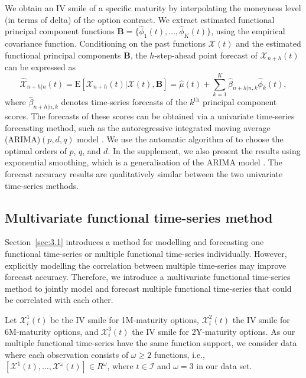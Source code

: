 \documentclass[12pt,a4paper]{article}
\newcommand{\X}{\mathcal{X}}
\begin{document}
We obtain an IV smile of a specific maturity by interpolating the moneyness level (in terms of delta) of the option contract. We extract estimated functional principal component functions $\bm{B} = \big\{\widehat{\phi}_1(t), \dots, \widehat{\phi}_K(t)\big\}$, using the empirical covariance function. Conditioning on the past functions $\bm{\X}(t)$ and the estimated functional principal components $\bm{B}$, the $h$-step-ahead point forecast of $\X_{n+h}(t)$ can be expressed as
\begin{equation*}
\widehat{\X}_{n+h|n}(t) = \text{E}\left[\X_{n+h}(t)|\bm{\X}(t),\bm{B}\right] =\widehat{\mu}(t) + \sum^K_{k=1}\widehat{\beta}_{n+h|n, k}\widehat{\phi}_k(t),
\end{equation*}
where $\widehat{\beta}_{n+h|n, k}$ denotes time-series forecasts of the $k^{\text{th}}$ principal component scores. The forecasts of these scores can be obtained via a univariate time-series forecasting method, such as the autoregressive integrated moving average (ARIMA)$(p,d,q)$ model \citep[see][for a review]{OF13}. We use the automatic algorithm of \cite{HK08} to choose the optimal orders of $p$, $q$, and $d$. In the supplement, we also present the results using exponential smoothing, which is a generalisation of the ARIMA model \citep[see, e.g.,][]{KS19}. The forecast accuracy results are qualitatively similar between the two univariate time-series methods.

\subsection{Multivariate functional time-series method}\label{sec:mfts}

Section~\ref{sec:3.1} introduces a method for modelling and forecasting one functional time-series or multiple functional time-series individually. However, explicitly modelling the correlation between multiple time-series may improve forecast accuracy. Therefore, we introduce a multivariate functional time-series method to jointly model and forecast multiple functional time-series that could be correlated with each other.

Let $\X_i^{1}(t)$ be the IV smile for 1M-maturity options, $\X_i^{2}(t)$ the IV smile for 6M-maturity options, and $\X_i^{3}(t)$ the IV smile for 2Y-maturity options. As our multiple functional time-series have the same function support, we consider data where each observation consists of $\omega\geq 2$ functions, i.e., $\left[\X^{1}(t),\dots, \X^{\omega}(t)\right]\in R^{\omega}$, where $t\in \mathcal{I}$ and $\omega = 3$ in our data set.
\end{document}

